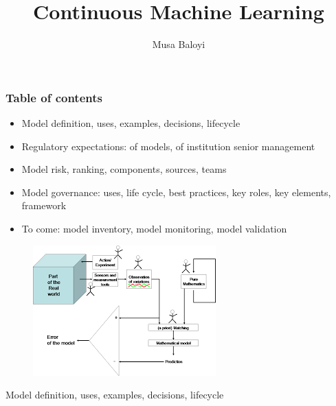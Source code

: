 \documentclass[11pt]{beamer}
\begin{document}
	\author{Musa Baloyi}
	\title{Continuous Machine Learning}
	\begin{frame}[plain]
	\maketitle
\end{frame}


\begin{frame}
\frametitle{Table of contents}
\begin{itemize}
	\item Model definition, uses, examples, decisions, lifecycle
	\item Regulatory expectations: of models, of institution senior management
	\item Model risk, ranking, components, sources, teams%
	\item Model governance: uses, life cycle, best practices, key roles, key elements, framework
	\item To come: model inventory, model monitoring, model validation
\end{itemize}
\end{frame}

\begin{frame}
\begin{figure}[h]
	\centering
	\includegraphics[scale=.7]{images/model}
\end{figure}
\centering
Model definition, uses, examples, decisions, lifecycle
\end{frame}
\end{document}
